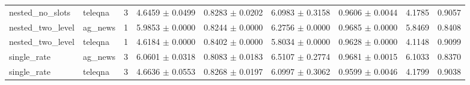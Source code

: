\begin{tabular}{lllllllll}
nested\_no\_slots & teleqna & 3 & 4.6459 $\pm$ 0.0499 & 0.8283 $\pm$ 0.0202 & 6.0983 $\pm$ 0.3158 & 0.9606 $\pm$ 0.0044 & 4.1785 & 0.9057 \\
nested\_two\_level & ag\_news & 1 & 5.9853 $\pm$ 0.0000 & 0.8244 $\pm$ 0.0000 & 6.2756 $\pm$ 0.0000 & 0.9685 $\pm$ 0.0000 & 5.8469 & 0.8408 \\
nested\_two\_level & teleqna & 1 & 4.6184 $\pm$ 0.0000 & 0.8402 $\pm$ 0.0000 & 5.8034 $\pm$ 0.0000 & 0.9628 $\pm$ 0.0000 & 4.1148 & 0.9099 \\
single\_rate & ag\_news & 3 & 6.0601 $\pm$ 0.0318 & 0.8083 $\pm$ 0.0183 & 6.5107 $\pm$ 0.2774 & 0.9681 $\pm$ 0.0015 & 6.1033 & 0.8370 \\
single\_rate & teleqna & 3 & 4.6636 $\pm$ 0.0553 & 0.8268 $\pm$ 0.0197 & 6.0997 $\pm$ 0.3062 & 0.9599 $\pm$ 0.0046 & 4.1799 & 0.9038 \\
\hline
\end{tabular}
